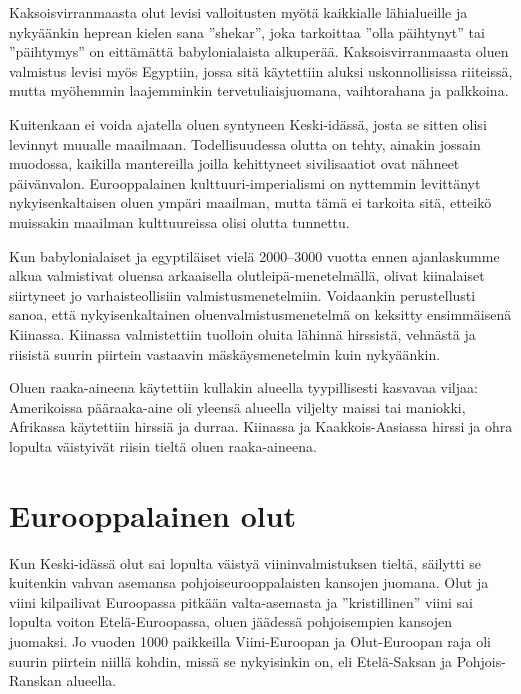 \documentclass[a4paper,11pt]{report}
\begin{document}
Kaksoisvirranmaasta olut levisi valloitusten myötä kaikkialle lähialueille ja nykyäänkin heprean kielen sana ''shekar'', joka tarkoittaa ''olla päihtynyt'' tai ''päihtymys'' on eittämättä babylonialaista alkuperää. Kaksoisvirranmaasta oluen valmistus levisi myös Egyptiin, jossa sitä käytettiin aluksi uskonnollisissa riiteissä, mutta myöhemmin laajemminkin tervetuliaisjuomana, vaihtorahana ja palkkoina.

Kuitenkaan ei voida ajatella oluen syntyneen Keski-idässä, josta se sitten olisi levinnyt muualle maailmaan. Todellisuudessa olutta on tehty, ainakin jossain muodossa, kaikilla mantereilla joilla kehittyneet sivilisaatiot ovat nähneet päivänvalon. Eurooppalainen kulttuuri-imperialismi on nyttemmin levittänyt nykyisenkaltaisen oluen ympäri maailman, mutta tämä ei tarkoita sitä, etteikö muissakin maailman kulttuureissa olisi olutta tunnettu.

Kun babylonialaiset ja egyptiläiset vielä 2000--3000 vuotta ennen ajanlaskumme alkua valmistivat oluensa arkaaisella olutleipä-menetelmällä, olivat kiinalaiset siirtyneet jo varhaisteollisiin valmistusmenetelmiin. Voidaankin perustellusti sanoa, että nykyisenkaltainen oluenvalmistusmenetelmä on keksitty ensimmäisenä Kiinassa. Kiinassa valmistettiin tuolloin oluita lähinnä hirssistä, vehnästä ja riisistä suurin piirtein vastaavin mäskäysmenetelmin kuin nykyäänkin.

Oluen raaka-aineena käytettiin kullakin alueella tyypillisesti kasvavaa viljaa: Amerikoissa pääraaka-aine oli yleensä alueella viljelty maissi tai maniokki, Afrikassa käytettiin hirssiä ja durraa. Kiinassa ja Kaakkois-Aasiassa hirssi ja ohra lopulta väistyivät riisin tieltä oluen raaka-aineena.

\section{Eurooppalainen olut}

Kun Keski-idässä olut sai lopulta väistyä viininvalmistuksen tieltä, säilytti se kuitenkin vahvan asemansa pohjoiseurooppalaisten kansojen juomana. Olut ja viini kilpailivat Euroopassa pitkään valta-asemasta ja ''kristillinen'' viini sai lopulta voiton Etelä-Euroopassa, oluen jäädessä pohjoisempien kansojen juomaksi. Jo vuoden 1000 paikkeilla Viini-Euroopan ja Olut-Euroopan raja oli suurin piirtein niillä kohdin, missä se nykyisinkin on, eli Etelä-Saksan ja Pohjois-Ranskan alueella.
\end{document}
